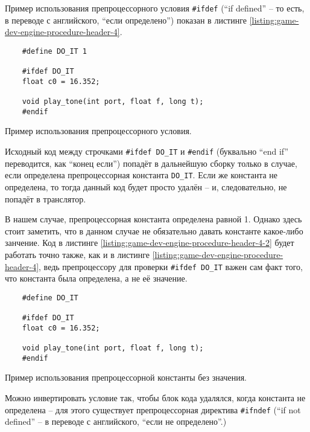\documentclass[../sparc.tex]{subfiles}
\begin{document}
Пример использования препроцессорного условия \texttt{#ifdef} (``if
defined'' -- то есть, в переводе с английского, ``если определено'') показан в
листинге \ref{listing:game-dev-engine-procedure-header-4}.

\begin{listing}[H]
  \begin{verbatim}
    #define DO_IT 1

    #ifdef DO_IT
    float c0 = 16.352;

    void play_tone(int port, float f, long t);
    #endif
  \end{verbatim}
  \label{listing:game-dev-engine-procedure-header-4}
  \caption{Пример использования препроцессорного условия.}
\end{listing}

Исходный код между строчками \texttt{#ifdef DO_IT} и
\texttt{#endif} (буквально ``end if'' переводится, как ``конец если'')
попадёт в дальнейшую сборку только в случае, если определена препроцессорная
константа \texttt{DO_IT}.  Если же константа не определена, то тогда
данный код будет просто удалён -- и, следовательно, не попадёт в транслятор.

В нашем случае, препроцессорная константа определена равной 1.  Однако здесь
стоит заметить, что в данном случае не обязательно давать константе какое-либо
занчение.  Код в листинге \ref{listing:game-dev-engine-procedure-header-4-2}
будет работать точно также, как и в листинге
\ref{listing:game-dev-engine-procedure-header-4}, ведь препроцессору для
проверки \texttt{#ifdef DO_IT} важен сам факт того, что константа была
определена, а не её значение.

\begin{listing}[H]
  \begin{verbatim}
    #define DO_IT

    #ifdef DO_IT
    float c0 = 16.352;

    void play_tone(int port, float f, long t);
    #endif
  \end{verbatim}
  \label{listing:game-dev-engine-procedure-header-4-2}
  \caption{Пример использования препроцессорной константы без значения.}
\end{listing}

Можно инвертировать условие так, чтобы блок кода удалялся, когда константа не
определена -- для этого существует препроцессорная директива
\texttt{#ifndef} (``if not defined'' -- в переводе с английского, ``если
не определено''.)
\end{document}
